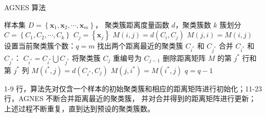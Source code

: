 \begin{algorithm}[H]
    \renewcommand{\algorithmicrequire}{\textbf{Input:}}
	\renewcommand{\algorithmicensure}{\textbf{Output:}}
    \caption{AGNES 算法}
    \begin{algorithmic}[1]
        \REQUIRE 样本集 $D = \left\{\boldsymbol{x}_1, \boldsymbol{x}_2, \cdots, \boldsymbol{x}_m\right\}$，
        聚类簇距离度量函数 $d$，聚类簇数 $k$
        \ENSURE 簇划分 $C = \left\{C_1, C_2, \cdots, C_k\right\}$
            \STATE $C_j = \left\{\boldsymbol{x}_j\right\}$
        \ENDFOR
                \STATE $M(i, j) = d(C_i, C_j)$
                \STATE $M(j, i) = M(i, j)$
            \ENDFOR
        \ENDFOR
        \STATE 设置当前聚类簇个数：$q = m$
            \STATE 找出两个距离最近的聚类簇 $C_{i^*}$ 和 $C_{j^*}$
            \STATE 合并 $C_{i^*}$ 和 $C_{j^*}$： $C_{i^*} = C_{i^*} \bigcup C_{j^*}$
                \STATE 将聚类簇 $C_j$ 重编号为 $C_{j-1}$
            \ENDFOR
            \STATE 删除距离矩阵 $M$ 的第 $j^*$ 行和第 $j^*$ 列
                \STATE $M(i^*, j) = d(C_{i^*}, C_j)$
                \STATE $M(j, i^*) = M(i^*, j)$
            \ENDFOR
            \STATE $q = q - 1$
        \ENDWHILE
    \end{algorithmic}
\end{algorithm}

1-9 行，算法先对仅含一个样本的初始聚类簇和相应的距离矩阵进行初始化；11-23 行，AGNES 不断合并距离最近的聚类簇，
并对合并得到的距离矩阵进行更新；上述过程不断重复，直到达到预设的聚类簇数。